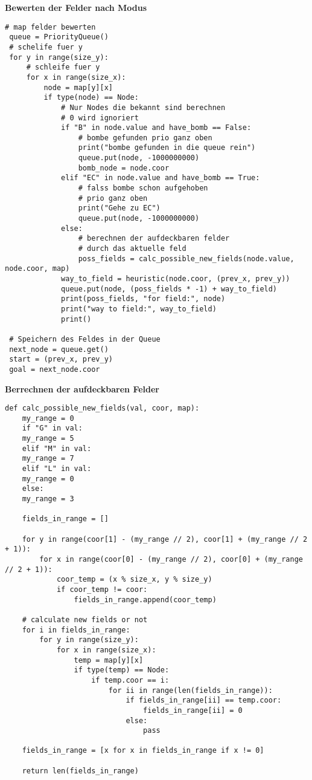 \begin{minipage}{.5\textwidth}
	\hspace{0.9cm}\textbf{Bewerten der Felder nach Modus}
	\begin{lstlisting}[style=python, caption=Felder Bewerten]
 # map felder bewerten
 queue = PriorityQueue()
 # schelife fuer y
 for y in range(size_y):
	 # schleife fuer y
	 for x in range(size_x):
		 node = map[y][x]
		 if type(node) == Node:
			 # Nur Nodes die bekannt sind berechnen
			 # 0 wird ignoriert
			 if "B" in node.value and have_bomb == False:
				 # bombe gefunden prio ganz oben
				 print("bombe gefunden in die queue rein")
				 queue.put(node, -1000000000)
				 bomb_node = node.coor
			 elif "EC" in node.value and have_bomb == True:
				 # falss bombe schon aufgehoben 
				 # prio ganz oben
				 print("Gehe zu EC")
				 queue.put(node, -1000000000)
			 else:
				 # berechnen der aufdeckbaren felder
				 # durch das aktuelle feld
				 poss_fields = calc_possible_new_fields(node.value, node.coor, map)
			 way_to_field = heuristic(node.coor, (prev_x, prev_y))
			 queue.put(node, (poss_fields * -1) + way_to_field)
			 print(poss_fields, "for field:", node)
			 print("way to field:", way_to_field)
			 print()
 
 # Speichern des Feldes in der Queue
 next_node = queue.get()
 start = (prev_x, prev_y)
 goal = next_node.coor
	\end{lstlisting}
\end{minipage}%
\begin{minipage}{.5\textwidth}
	\hspace{0.7cm}\textbf{Berrechnen der aufdeckbaren Felder}
	\begin{lstlisting}[style=python2, caption=Mögliche Felder ermitteln]
def calc_possible_new_fields(val, coor, map):
	my_range = 0
	if "G" in val:
	my_range = 5
	elif "M" in val:
	my_range = 7
	elif "L" in val:
	my_range = 0
	else:
	my_range = 3

	fields_in_range = []

	for y in range(coor[1] - (my_range // 2), coor[1] + (my_range // 2 + 1)):
		for x in range(coor[0] - (my_range // 2), coor[0] + (my_range // 2 + 1)):
			coor_temp = (x % size_x, y % size_y)
			if coor_temp != coor:
				fields_in_range.append(coor_temp)
	
	# calculate new fields or not
	for i in fields_in_range:
		for y in range(size_y):
			for x in range(size_x):
				temp = map[y][x]
				if type(temp) == Node:
					if temp.coor == i:
						for ii in range(len(fields_in_range)):
							if fields_in_range[ii] == temp.coor:
								fields_in_range[ii] = 0
							else:
								pass
	
	fields_in_range = [x for x in fields_in_range if x != 0]
	
	return len(fields_in_range)
	\end{lstlisting}
\end{minipage}
